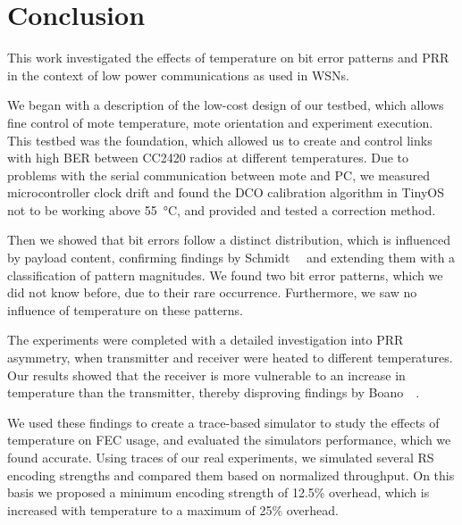 \chapter{Conclusion}

This work investigated the effects of temperature on bit error patterns and \ac{PRR} in the context of low power communications as used in \acp{WSN}.

We began with a description of the low-cost design of our testbed, which allows fine control of mote temperature, mote orientation and experiment execution.
This testbed was the foundation, which allowed us to create and control links with high \ac{BER} between CC2420 radios at different temperatures.
Due to problems with the serial communication between mote and PC, we measured microcontroller clock drift and found the \ac{DCO} calibration algorithm in TinyOS not to be working above \SI{55}{\celsius}, and provided and tested a correction method.

Then we showed that bit errors follow a distinct distribution, which is influenced by payload content, confirming findings by Schmidt~\etal~\cite{Schmidt2013} and extending them with a classification of pattern magnitudes.
We found two bit error patterns, which we did not know before, due to their rare occurrence.
Furthermore, we saw no influence of temperature on these patterns.

The experiments were completed with a detailed investigation into \ac{PRR} asymmetry, when transmitter and receiver were heated to different temperatures.
Our results showed that the receiver is more vulnerable to an increase in temperature than the transmitter, thereby disproving findings by Boano~\etal~\cite{Boano2013}.

We used these findings to create a trace-based simulator to study the effects of temperature on \ac{FEC} usage, and evaluated the simulators performance, which we found accurate.
Using traces of our real experiments, we simulated several \ac{RS} encoding strengths and compared them based on normalized throughput.
On this basis we proposed a minimum encoding strength of 12.5\% overhead, which is increased with temperature to a maximum of 25\% overhead.




